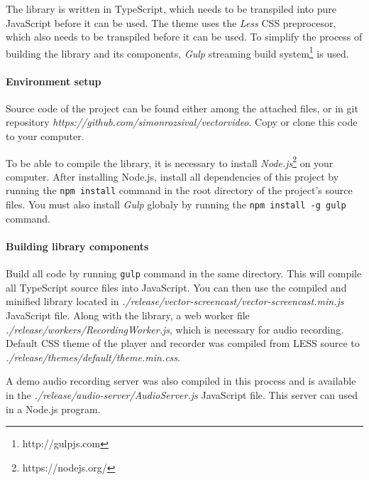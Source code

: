 The library is written in TypeScript, which needs to be transpiled into pure JavaScript before it can be used. The theme uses the \textit{Less} CSS preprocesor, which also needs to be transpiled before it can be used. To simplify the process of building the library and its components, \textit{Gulp} streaming build system\footnote{http://gulpjs.com} is used.

\paragraph{Environment setup}
Source code of the project can be found either among the attached files, or in git repository \textit{https://github.com/simonrozsival/vectorvideo}. Copy or clone this code to your computer.

To be able to compile the library, it is necessary to install \textit{Node.js}\footnote{https://nodejs.org/} on your computer. After installing Node.js, install all dependencies of this project by running the \verb|npm install| command in the root directory of the project's source files. You must also install \textit{Gulp} globaly by running the \verb|npm install -g gulp| command.

\paragraph{Building library components}
Build all code by running \verb|gulp| command in the same directory. This will compile all TypeScript source files into JavaScript. You can then use the compiled and minified library located in \textit{./release/vector-screencast/vector-screencast.min.js} JavaScript file. Along with the library, a web worker file \textit{./release/workers/RecordingWorker.js}, which is necessary for audio recording. Default CSS theme of the player and recorder was compiled from LESS source to \textit{./release/themes/default/theme.min.css}.

A demo audio recording server was also compiled in this process and is available in the \textit{./release/audio-server/AudioServer.js} JavaScript file. This server can used in a Node.js program.

